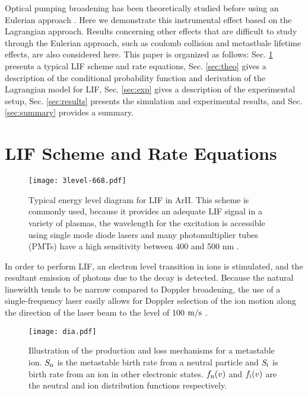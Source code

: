 \documentclass[aip,pop,reprint]{revtex4-1}
\begin{document}

Optical pumping broadening has been theoretically studied before using an Eulerian approach \cite{goeckner_laserinduced_1989}. Here we demonstrate this instrumental effect based on the Lagrangian approach. Results concerning other effects that are difficult to study through the Eulerian approach, such as coulomb collision and metastbale lifetime effects, are also considered here. This paper is organized as follows: Sec. \ref{sec:LIF} presents a typical LIF scheme and rate equations, Sec. \ref{sec:theo} gives a description of the conditional probability function and derivation of the Lagrangian model for LIF, Sec. \ref{sec:exp} gives a description of the experimental setup, Sec. \ref{sec:results} presents the simulation and experimental results, and Sec. \ref{sec:summary} provides a summary.

\section{LIF Scheme and Rate Equations}
\label{sec:LIF}

\begin{figure}
\begin{center}
\texttt{[image: 3level-668.pdf]}
\caption{Typical energy level diagram for LIF in ArII. This scheme is commonly used, because it provides an adequate LIF signal in a variety of plasmas, the wavelength for the excitation is accessible using single mode diode lasers and many photomultiplier tubes (PMTs) have a high sensitivity between 400 and 500 nm \cite{severn_argon_1998}.}
\label{fig:LIF}
\end{center}
\end{figure}

In order to perform LIF, an electron level transition in ions is stimulated, and the resultant emission of photons due to the decay is detected. Because the natural linewidth tends to be narrow compared to Doppler broadening, the use of a single-frequency laser easily allows for Doppler selection of the ion motion along the direction of the laser beam to the level of 100 $\textup{m/s}$ \cite{skiff_mini-conference_2004}.

\begin{figure}
\begin{center}
\texttt{[image: dia.pdf]}
\caption{Illustration of the production and loss mechanisms for a metastable ion. $S_\textup{n}$ is the metastable birth rate from a neutral particle and $S_\textup{i}$ is birth rate from an ion in other electronic states. $f_\textup{n}(v)$ and $f_\textup{i}(v)$ are the neutral and ion distribution functions respectively.}
\label{fig:dia}
\end{center}
\end{figure}
\end{document}
